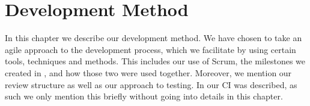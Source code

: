 \chapter{Development Method}\label{cha:development_method}
In this chapter we describe our development method.
We have chosen to take an agile approach to the development process, which we facilitate by using certain tools, techniques and methods.
This includes our use of Scrum, the milestones we created in , and how those two were used together.
Moreover, we mention our review structure as well as our approach to testing.
In  our \ac{CI} was described, as such we only mention this briefly without going into details in this chapter.

